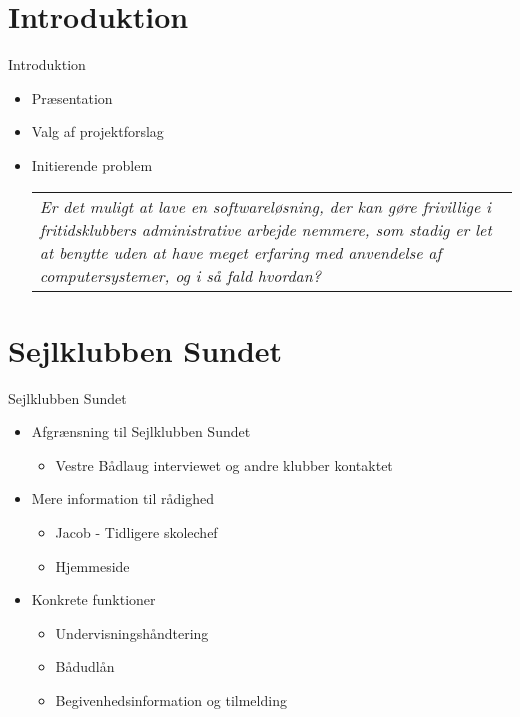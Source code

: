 \section{Introduktion}

\begin{frame}{Introduktion}

	\begin{itemize}
	\item Præsentation
	\item Valg af projektforslag
	\item Initierende problem
	\newline	
	
		\begin{tabular}{|p{8cm}|}
		\textit{Er det muligt at lave en softwareløsning, der kan gøre frivillige i fritidsklubbers administrative
		arbejde nemmere, som stadig er let at benytte uden at have meget erfaring med anvendelse af computersystemer, og i så fald hvordan?}
	    \end{tabular}
	\newline
	
	\end{itemize}

\end{frame}

\section{Sejlklubben Sundet}

\begin{frame}{Sejlklubben Sundet}

	\begin{itemize}
	\item Afgrænsning til Sejlklubben Sundet
			\begin{itemize}
			\item Vestre Bådlaug interviewet og andre klubber kontaktet
			\end{itemize}
	\item Mere information til rådighed
			\begin{itemize}
			\item Jacob - Tidligere skolechef
			\item Hjemmeside
			\end{itemize} 
	\item Konkrete funktioner
		\begin{itemize}
		\item Undervisningshåndtering
		\item Bådudlån
		\item Begivenhedsinformation og tilmelding
		\end{itemize}
	
	\end{itemize}
	
\end{frame}